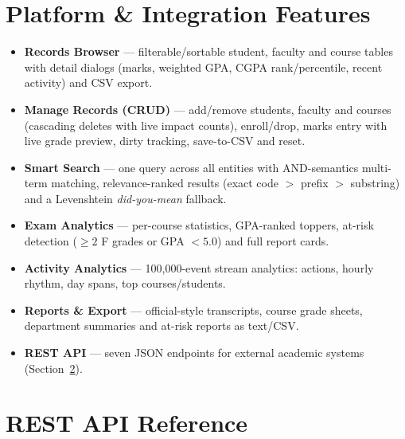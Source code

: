 \documentclass[11pt,a4paper]{article}
\begin{document}
\section{Platform \& Integration Features}

\begin{itemize}
    \item \textbf{Records Browser} --- filterable/sortable student, faculty and course
    tables with detail dialogs (marks, weighted GPA, CGPA rank/percentile, recent
    activity) and CSV export.
    \item \textbf{Manage Records (CRUD)} --- add/remove students, faculty and courses
    (cascading deletes with live impact counts), enroll/drop, marks entry with live
    grade preview, dirty tracking, save-to-CSV and reset.
    \item \textbf{Smart Search} --- one query across all entities with AND-semantics
    multi-term matching, relevance-ranked results (exact code $>$ prefix $>$ substring)
    and a Levenshtein \emph{did-you-mean} fallback.
    \item \textbf{Exam Analytics} --- per-course statistics, GPA-ranked toppers,
    at-risk detection ($\ge 2$ F grades or GPA $< 5.0$) and full report cards.
    \item \textbf{Activity Analytics} --- 100{,}000-event stream analytics: actions,
    hourly rhythm, day spans, top courses/students.
    \item \textbf{Reports \& Export} --- official-style transcripts, course grade
    sheets, department summaries and at-risk reports as text/CSV.
    \item \textbf{REST API} --- seven JSON endpoints for external academic systems
    (Section~\ref{sec:api}).
\end{itemize}

\section{REST API Reference}
\label{sec:api}
\end{document}
